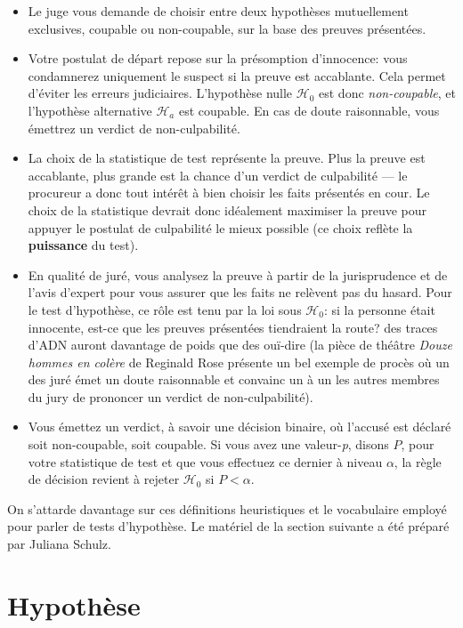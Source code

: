 \documentclass[
  11pt,
  letterpaper,
]{scrbook}
\providecommand{\tightlist}{%
  \setlength{\itemsep}{0pt}\setlength{\parskip}{0pt}}\usepackage{longtable,booktabs,array}
\theoremstyle{definition}
\theoremstyle{definition}
\theoremstyle{remark}
\begin{document}
\begin{itemize}
\tightlist
\item
  Le juge vous demande de choisir entre deux hypothèses mutuellement
  exclusives, coupable ou non-coupable, sur la base des preuves
  présentées.
\item
  Votre postulat de départ repose sur la présomption d'innocence: vous
  condamnerez uniquement le suspect si la preuve est accablante. Cela
  permet d'éviter les erreurs judiciaires. L'hypothèse nulle
  \(\mathscr{H}_0\) est donc \emph{non-coupable}, et l'hypothèse
  alternative \(\mathscr{H}_a\) est coupable. En cas de doute
  raisonnable, vous émettrez un verdict de non-culpabilité.
\item
  La choix de la statistique de test représente la preuve. Plus la
  preuve est accablante, plus grande est la chance d'un verdict de
  culpabilité --- le procureur a donc tout intérêt à bien choisir les
  faits présentés en cour. Le choix de la statistique devrait donc
  idéalement maximiser la preuve pour appuyer le postulat de culpabilité
  le mieux possible (ce choix reflète la \textbf{puissance} du test).
\item
  En qualité de juré, vous analysez la preuve à partir de la
  jurisprudence et de l'avis d'expert pour vous assurer que les faits ne
  relèvent pas du hasard. Pour le test d'hypothèse, ce rôle est tenu par
  la loi sous \(\mathscr{H}_0\): si la personne était innocente, est-ce
  que les preuves présentées tiendraient la route? des traces d'ADN
  auront davantage de poids que des ouï-dire (la pièce de théâtre
  \emph{Douze hommes en colère} de Reginald Rose présente un bel exemple
  de procès où un des juré émet un doute raisonnable et convainc un à un
  les autres membres du jury de prononcer un verdict de
  non-culpabilité).
\item
  Vous émettez un verdict, à savoir une décision binaire, où l'accusé
  est déclaré soit non-coupable, soit coupable. Si vous avez une
  valeur-\emph{p}, disons \(P\), pour votre statistique de test et que
  vous effectuez ce dernier à niveau \(\alpha\), la règle de décision
  revient à rejeter \(\mathscr{H}_0\) si \(P < \alpha\).
\end{itemize}

On s'attarde davantage sur ces définitions heuristiques et le
vocabulaire employé pour parler de tests d'hypothèse. Le matériel de la
section suivante a été préparé par Juliana Schulz.

\section{Hypothèse}\label{hypothuxe8se}
\end{document}
